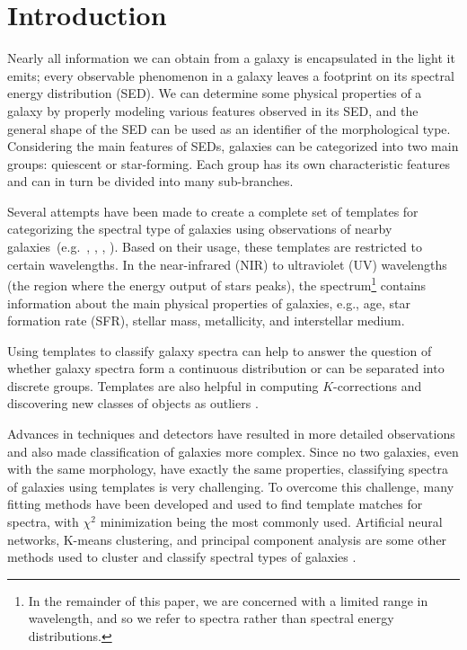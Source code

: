 \section{Introduction}
\label{sec: intro_somz}


Nearly all information we can obtain from a galaxy is encapsulated in the light it emits; every observable phenomenon in a galaxy leaves a footprint on its spectral energy distribution (SED).
We can determine some physical properties of a galaxy by properly modeling various features observed in its SED, and the general shape of the SED can be used as an identifier of the morphological type.
Considering the main features of SEDs, galaxies can be categorized into two main groups: quiescent or star-forming.
Each group has its own characteristic features and can in turn be divided into many sub-branches.


Several attempts have been made to create a complete set of templates for categorizing the spectral type of galaxies using observations of nearby galaxies~(e.g.~\citealt{Kinney93}, \citealt[][hereafter ]{Kinney96}, \citealt{Bershady00}, \citealt{Mannucci01}). 
Based on their usage, these templates are restricted to certain wavelengths.
In the near-infrared (NIR) to ultraviolet (UV) wavelengths (the region where the energy output of stars peaks), the spectrum\footnote{In the remainder of this paper, we are concerned with a limited range in wavelength, and so we refer to spectra rather than spectral energy distributions.} contains information about the main physical properties of galaxies, e.g., age, star formation rate (SFR), stellar mass, metallicity, and interstellar medium. 

Using templates to classify galaxy spectra can help to answer the question of whether galaxy spectra form a continuous distribution or can  be separated into discrete groups.
Templates are also helpful in computing $K$-corrections and discovering new classes of objects as outliers \citep{Folkes96}.




Advances in techniques and detectors have resulted in more detailed observations and also made classification of galaxies more complex.
Since no two galaxies, even with the same morphology, have exactly the same properties, classifying spectra of galaxies using templates is very challenging.
To overcome this challenge, many fitting methods have been developed and used to find template matches for spectra, with $\chi^2$ minimization being the most commonly used. 
Artificial neural networks, K-means clustering, and principal component analysis are some other methods used to cluster and classify spectral types of galaxies \citep[e.g.][]{Allen13,Ordov14,Shi15}.


